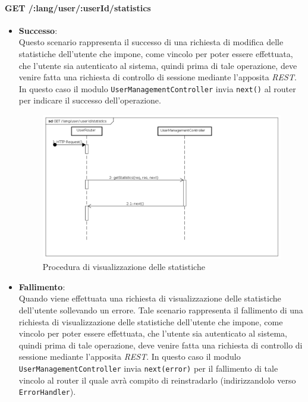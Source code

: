\paragraph{GET /:lang/user/:userId/statistics}
\begin{itemize}
\item \textbf{Successo}:
\\
Questo scenario rappresenta il successo di una richiesta di modifica delle statistiche  dell'utente che impone, come vincolo per poter essere effettuata, che l'utente sia autenticato al sistema, quindi prima di tale operazione, deve venire fatta una richiesta di controllo di sessione mediante l'apposita \textit{REST}.  
In questo caso il modulo \texttt{UserManagementController} invia \texttt{next()} al router per indicare il successo dell'operazione.

\label{Procedura di visualizzazione delle statistiche}
\begin{figure}[ht]
	\centering
	\includegraphics[scale=0.40]{UML/DiagrammiDiSequenza/Back-end/GET_LangUserUserIdStatisticsSuccess.png}
	\caption{Procedura di visualizzazione delle statistiche}
\end{figure}
\FloatBarrier
\item \textbf{Fallimento}:
\\
Quando viene effettuata una richiesta di visualizzazione delle statistiche dell'utente sollevando un errore. Tale scenario rappresenta il fallimento di una richiesta di visualizzazione delle statistiche dell'utente che impone, come vincolo per poter essere effettuata, che l'utente sia autenticato al sistema, quindi prima di tale operazione, deve venire fatta una richiesta di controllo di sessione mediante l'apposita \textit{REST}. In questo caso il modulo \texttt{UserManagementController} invia \texttt{next(error)} per il fallimento di tale vincolo al router il quale avrà compito di reinstradarlo (indirizzandolo verso \texttt{ErrorHandler}).


\end{itemize}
